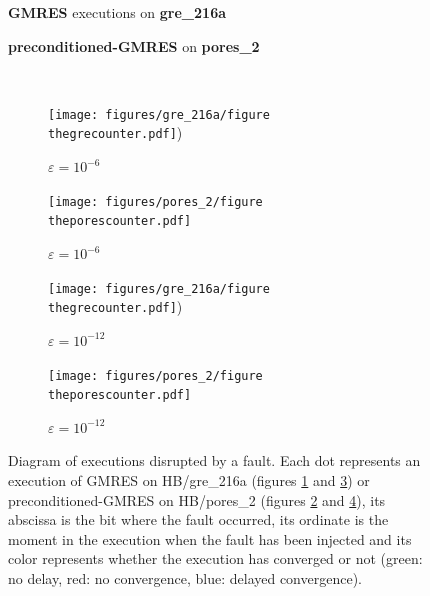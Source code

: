 \documentclass[twoside]{article}
\newcounter{fig}\setcounter{fig}{0}
\begin{document}
  \begin{figure}[ht] 
    \hspace{3ex}
    \begin{minipage}[b]{0.5\linewidth}
      \centering
      \textbf{GMRES} executions on \textbf{gre_216a} 
    \end{minipage}
    \quad
    \begin{minipage}{0.5\linewidth}
      \centering
      \textbf{preconditioned-GMRES} on \textbf{pores_2}
    \end{minipage}\\

    \begin{subfigure}[b]{0.5\linewidth}
      \centering
      \texttt{[image: figures/gre\_216a/figure\\thegrecounter.pdf]})
      \caption{$\varepsilon = 10^{-6}$}
      \label{fig:gre_216a_bit_iteration_0}	
    \end{subfigure}%
    \hspace{4ex}
    \begin{subfigure}[b]{0.5\linewidth}
      \centering
      \texttt{[image: figures/pores\_2/figure\\theporescounter.pdf]}
      \caption{$\varepsilon = 10^{-6}$}
      \label{fig:pores_2_bit_iteration_0}	
    \end{subfigure} 

    \begin{subfigure}[b]{0.5\linewidth}
      \centering
      \texttt{[image: figures/gre\_216a/figure\\thegrecounter.pdf]})
      \caption{$\varepsilon = 10^{-12}$}
      \label{fig:gre_216a_bit_iteration_1}	
    \end{subfigure}%
    \hspace{4ex}
    \begin{subfigure}[b]{0.5\linewidth}
      \centering
      \texttt{[image: figures/pores\_2/figure\\theporescounter.pdf]}
      \caption{$\varepsilon = 10^{-12}$}
      \label{fig:pores_2_bit_iteration_1}	
    \end{subfigure} 
    \caption{Diagram of executions disrupted by a fault. Each dot represents an execution of GMRES on HB/gre_216a (figures \ref{fig:gre_216a_bit_iteration_0} and \ref{fig:gre_216a_bit_iteration_1}) or preconditioned-GMRES on HB/pores_2 (figures \ref{fig:pores_2_bit_iteration_0} and \ref{fig:pores_2_bit_iteration_1}), its abscissa is the bit where the fault occurred, its ordinate is the moment in the execution when the fault has been injected and its color represents whether the execution has converged or not (green: no delay, red: no convergence, blue: delayed convergence).}
    \label{fig:bit_iteration}
  \end{figure}
\end{document}
